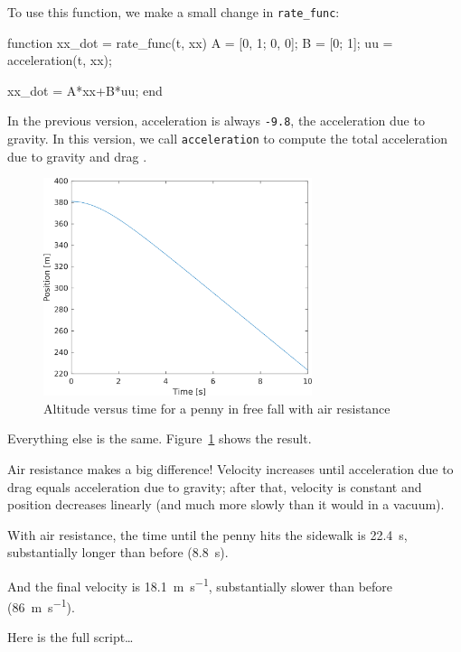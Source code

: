 To use this function, we make a small change in \lstinline{rate_func}:

\begin{code}
function xx_dot = rate_func(t, xx)
    A = [0, 1; 0, 0];
    B = [0; 1];
    uu = acceleration(t, xx);
    
    xx_dot = A*xx+B*uu;
end
\end{code}

In the previous version, acceleration is always \lstinline{-9.8}, the acceleration due to gravity.
In this version, we call \lstinline{acceleration} to compute the total acceleration due to gravity and drag .

\begin{figure}[ht]
\centerline{\includegraphics[width=0.7\textwidth]{../code/chap11/penny_event_drag.png}}
\caption{Altitude versus time for a penny in free fall with air resistance}
\label{fig:penny2}
\end{figure}

Everything else is the same.  Figure~\ref{fig:penny2} shows the result.

Air resistance makes a big difference! Velocity increases until
acceleration due to drag equals acceleration due to gravity; after that, velocity is constant and position decreases linearly (and much more slowly than it would in a vacuum).

With air resistance, the time until the penny hits the sidewalk is \SI{22.4}{\second}, substantially longer than before (\SI{8.8}{\second}).

And the final velocity is \SI{18.1}{\meter \per \second}, substantially slower than before (\SI{86}{\meter \per \second}).

Here is the full script\dots


